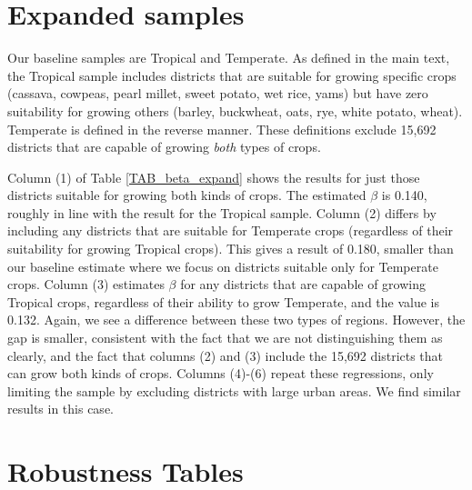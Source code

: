 \documentclass[11pt]{article}
\begin{document}
\section{Expanded samples}
Our baseline samples are Tropical and Temperate. As defined in the main text, the Tropical sample includes districts that are suitable for growing specific crops (cassava, cowpeas, pearl millet, sweet potato, wet rice, yams) but have zero suitability for growing others (barley, buckwheat, oats, rye, white potato, wheat). Temperate is defined in the reverse manner. These definitions exclude 15,692 districts that are capable of growing \textit{both} types of crops. 

Column (1) of Table \ref{TAB_beta_expand} shows the results for just those districts suitable for growing both kinds of crops. The estimated $\beta$ is 0.140, roughly in line with the result for the Tropical sample. Column (2) differs by including any districts that are suitable for Temperate crops (regardless of their suitability for growing Tropical crops). This gives a result of 0.180, smaller than our baseline estimate where we focus on districts suitable only for Temperate crops. Column (3) estimates $\beta$ for any districts that are capable of growing Tropical crops, regardless of their ability to grow Temperate, and the value is 0.132. Again, we see a difference between these two types of regions. However, the gap is smaller, consistent with the fact that we are not distinguishing them as clearly, and the fact that columns (2) and (3) include the 15,692 districts that can grow both kinds of crops. Columns (4)-(6) repeat these regressions, only limiting the sample by excluding districts with large urban areas. We find similar results in this case.

\section{Robustness Tables}
\listoftables
\end{document}
